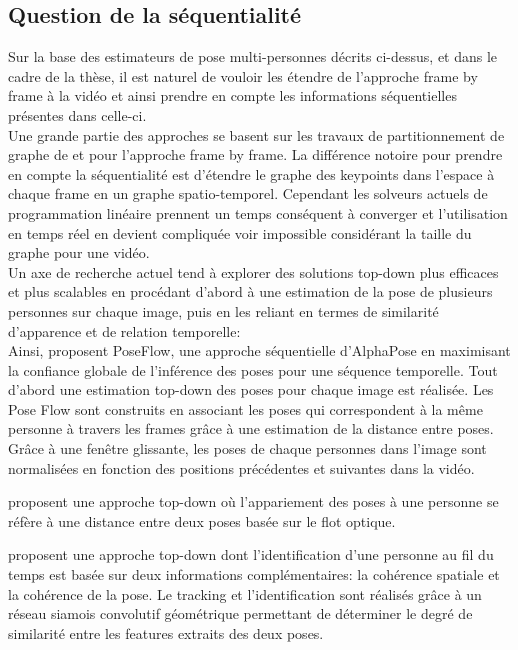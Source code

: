 \subsection{Question de la séquentialité}
Sur la base des estimateurs de pose multi-personnes décrits ci-dessus, et dans le cadre de la thèse, il est naturel de vouloir les étendre de l'approche frame by frame à la vidéo et ainsi prendre en compte les informations séquentielles présentes dans celle-ci.\\

Une grande partie des approches se basent sur les travaux de partitionnement de graphe de \cite{2015arXiv151106645P} et \cite{2016arXiv160503170I} pour l'approche frame by frame. La différence notoire pour prendre en compte la séquentialité est d'étendre le graphe des keypoints dans l'espace à chaque frame en un graphe spatio-temporel. Cependant les solveurs actuels de programmation linéaire prennent un temps conséquent à converger et l'utilisation en temps réel en devient compliquée voir impossible considérant la taille du graphe pour une vidéo.\\

Un axe de recherche actuel tend à explorer des solutions top-down plus efficaces et plus scalables en procédant d'abord à une estimation de la pose de plusieurs personnes sur chaque image, puis en les reliant
en termes de similarité d'apparence et de relation temporelle:\\

Ainsi, \cite{2018arXiv180200977X} proposent PoseFlow, une approche séquentielle d'AlphaPose \cite{fang2017rmpe} en maximisant la confiance globale de l'inférence des poses pour une séquence temporelle. Tout d'abord une estimation top-down des poses pour chaque image est réalisée. Les Pose Flow sont construits en associant les poses qui correspondent à la même personne à travers les frames grâce à une estimation de la distance entre poses. Grâce à une fenêtre glissante, les poses de chaque personnes dans l'image sont normalisées en fonction des positions précédentes et suivantes dans la vidéo.

\cite{2019arXiv190502822N} proposent une approche top-down où l'appariement des poses à une personne se réfère à une distance entre deux poses basée sur le flot optique.

\cite{2018arXiv180406208X} proposent une approche top-down dont l'identification d'une personne au fil du temps est basée sur deux informations complémentaires: la cohérence spatiale et la cohérence de la pose. Le tracking et l'identification sont réalisés grâce à un réseau siamois convolutif géométrique permettant de déterminer le degré de similarité entre les features extraits des deux poses.
 
